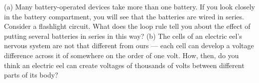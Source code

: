 (a) Many battery-operated devices take more than one
        battery. If you look closely in the battery compartment, you
        will see that the batteries are wired in series. Consider a
        flashlight circuit. What does the loop rule tell you about
        the effect of putting several batteries in series in this
        way? \hwendpart
        (b) The cells of an electric eel's nervous system are
        not that different from ours --- each cell can develop a
        voltage difference across it of somewhere on the order of
        one volt. How, then, do you think an electric eel can create
        voltages of thousands of volts between different parts of its body?
